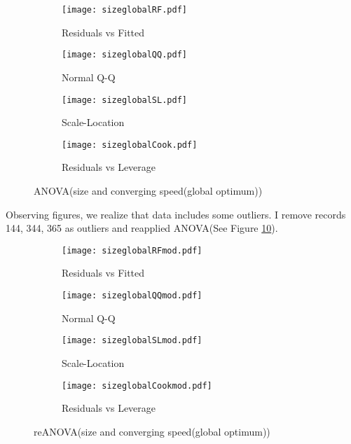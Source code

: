 \documentclass[uplatex]{jsarticle}
\begin{document}
	\begin{figure}[h]
	\centering
	  \begin{subfigure}{0.48\columnwidth}
	  \centering
	  \texttt{[image: sizeglobalRF.pdf]}
	  \caption{Residuals vs Fitted}
	  \label{fig:sizeglobalRF}
	  \end{subfigure}
	  \begin{subfigure}{0.48\columnwidth}
	  \centering
	  \texttt{[image: sizeglobalQQ.pdf]}
	  \caption{Normal Q-Q}
	  \label{fig:sizeglobalQQ}
	  \end{subfigure}
	  \begin{subfigure}{0.48\columnwidth}
	  \centering
	  \texttt{[image: sizeglobalSL.pdf]}
	  \caption{Scale-Location}
	  \label{fig:sizeglobalSL}
	  \end{subfigure}
	  \begin{subfigure}{0.48\columnwidth}
	  \centering
	  \texttt{[image: sizeglobalCook.pdf]}
	  \caption{Residuals vs Leverage}
	  \label{fig:sizeglobalCook}
	  \end{subfigure}
	\caption{ANOVA(size and converging speed(global optimum))}
	\label{fig:anovaglobal}
	\end{figure}
	Observing figures, we realize that data includes some outliers. I remove records 144, 344, 365 as outliers and reapplied ANOVA(See Figure \ref{fig:anovaglobalmod}).
	\begin{figure}[h]
	\centering
	  \begin{subfigure}{0.48\columnwidth}
	    \centering
	    \texttt{[image: sizeglobalRFmod.pdf]}
	    \caption{Residuals vs Fitted}
	    \label{fig:sizeglobalRFmod}
	  \end{subfigure}
	  \begin{subfigure}{0.48\columnwidth}
	    \centering
	    \texttt{[image: sizeglobalQQmod.pdf]}
	    \caption{Normal Q-Q}
	    \label{fig:sizeglobalQQmod}
	  \end{subfigure}
	  \begin{subfigure}{0.48\columnwidth}
	    \centering
	    \texttt{[image: sizeglobalSLmod.pdf]}
	    \caption{Scale-Location}
	    \label{fig:sizeglobalSLmod}
	  \end{subfigure}
	  \begin{subfigure}{0.48\columnwidth}
	    \centering
	    \texttt{[image: sizeglobalCookmod.pdf]}
	    \caption{Residuals vs Leverage}
	    \label{fig:sizeglobalCookmod}
	  \end{subfigure}
	\caption{reANOVA(size and converging speed(global optimum))}
	\label{fig:anovaglobalmod}
	\end{figure}
\end{document}
